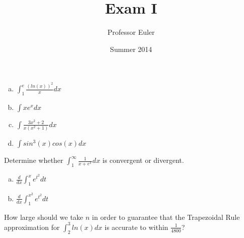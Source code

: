 \documentclass{wit_exam}
\author{Professor Euler}
\title{Exam I}
\date{Summer 2014}
\begin{document}
\begin{ProblemDefinition}

	\begin{enumerate}[a)]

		\item $\int_1^e{ \frac{ (ln(x))^2 }{ x } dx }$

		\vspace{10.0cm}
		\item{$\int{ x e^x dx }$}

		\newpage

		\item{$\int{ \frac{ 3x^2 + 2 }{ x( x^2 + 1 ) } dx }$}
		
		\vspace{10.0cm}
		\item{$\int{ sin^3(x) cos(x) dx }$}

	\end{enumerate}

\end{ProblemDefinition}


\begin{ProblemDefinition}

	Determine whether $ \int_1^\infty{ \frac{ 1 }{ x + e^x } dx } $ is convergent or divergent.

\end{ProblemDefinition}


\begin{ProblemDefinition}[Find:]

	\begin{enumerate}[a)]
	
		\item $ \frac{d}{dx} \int_1^x{ e^{ t^2 } dt } $
	
		\vspace{10.0cm}
		\item $ \frac{d}{dx} \int_1^{x^2}{ e^{ t^2 } dt } $
	
	\end{enumerate}

\end{ProblemDefinition}

\begin{ProblemDefinition}

	How large should we take $n$ in order to guarantee that the Trapezoidal Rule approximation for $ \int_2^3{ ln(x) dx } $ is accurate to within $\frac{1}{4800}$?

\end{ProblemDefinition}

\end{document}
